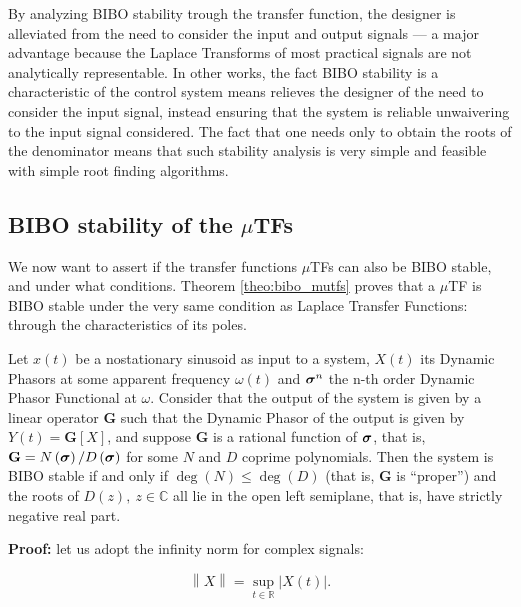 	By analyzing BIBO stability trough the transfer function, the designer is alleviated from the need to consider the input and output signals — a major advantage because the Laplace Transforms of most practical signals are not analytically representable. In other works, the fact BIBO stability is a characteristic of the control system means relieves the designer of the need to consider the input signal, instead ensuring that the system is reliable unwaivering to the input signal considered. The fact that one needs only to obtain the roots of the denominator means that such stability analysis is very simple and feasible with simple root finding algorithms.

\subsection{BIBO stability of the $\mu$TFs} %

	We now want to assert if the transfer functions $\mu$TFs can also be BIBO stable, and under what conditions. Theorem \ref{theo:bibo_mutfs} proves that a $\mu$TF is BIBO stable under the very same condition as Laplace Transfer Functions: through the characteristics of its poles.

\begin{theorem} \label{theo:bibo_mutfs}
	Let $x(t)$ be a nostationary sinusoid as input to a system, $X(t)$ its Dynamic Phasors at some apparent frequency $\omega(t)$ and $\boldsymbol{\sigma}^{n}$ the n-th order Dynamic Phasor Functional at $\omega$. Consider that the output of the system is given by a linear operator $\mathbf{G}$ such that the Dynamic Phasor of the output is given by $Y(t) = \mathbf{G}\left[X\right]$, and suppose $\mathbf{G}$ is a rational function of $\boldsymbol{\sigma}$, that is, $\mathbf{G} = N\left(\boldsymbol{\sigma}\right)/D\left(\boldsymbol{\sigma}\right)$ for some $N$ and $D$ coprime polynomials. Then the system is BIBO stable if and only if $\deg\left(N\right) \leq \deg\left(D\right)$ (that is, $\mathbf{G}$ is ``proper'') and the roots of $D\left(z\right),\ z\in\mathbb{C}$ all lie in the open left semiplane, that is, have strictly negative real part.
\end{theorem}
\textbf{Proof:} let us adopt the infinity norm for complex signals:

\begin{equation} \left\lVert X \right\rVert = \sup_{t\in\mathbb{R}} \left\lvert X(t)\right\rvert .\end{equation}

